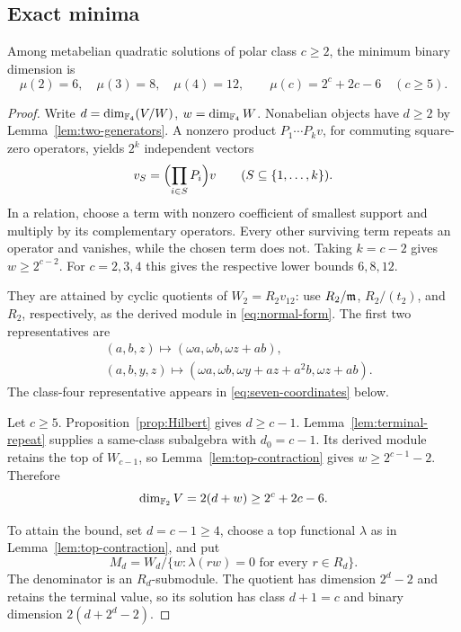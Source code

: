 \subsection{Exact minima}

\begin{theorem}\label{thm:unrestricted-minimum}
Among metabelian quadratic solutions of polar class \(c\ge2\), the
minimum binary dimension is
\[
 \mu(2)=6,\quad\mu(3)=8,\quad\mu(4)=12,\qquad
 \mu(c)=2^c+2c-6\quad(c\ge5).
\]
\end{theorem}
\begin{proof}
Write \(d=\dim_{\mathbb F_4}(V/W)\), \(w=\dim_{\mathbb F_4}W\).
Nonabelian objects have \(d\ge2\) by Lemma~\ref{lem:two-generators}.
A nonzero product \(P_1\cdots P_kv\), for commuting square-zero
operators, yields \(2^k\) independent vectors
\[
 v_S=\Bigl(\prod_{i\in S}P_i\Bigr)v\qquad(S\subseteq\{1,\ldots,k\}).
\]
In a relation, choose a term with nonzero coefficient of smallest support
and multiply by its complementary operators. Every other surviving
term repeats an operator and vanishes, while the chosen term does not.
Taking \(k=c-2\) gives \(w\ge2^{c-2}\).
For \(c=2,3,4\) this gives the respective lower bounds \(6,8,12\).

They are attained by cyclic quotients of \(W_2=R_2v_{12}\): use
\(R_2/\mathfrak m\), \(R_2/(t_2)\), and \(R_2\), respectively, as the
derived module in \eqref{eq:normal-form}.
The first two representatives are
\begin{align*}
 &(a,b,z)\longmapsto(\omega a,\omega b,\omega z+ab),\\
 &(a,b,y,z)\longmapsto
    (\omega a,\omega b,\omega y+az+a^2b,\omega z+ab).
\end{align*}
The class-four representative appears in
\eqref{eq:seven-coordinates} below.

Let \(c\ge5\). Proposition~\ref{prop:Hilbert} gives \(d\ge c-1\).
Lemma~\ref{lem:terminal-repeat} supplies a same-class subalgebra with
\(d_0=c-1\). Its derived module retains the top of \(W_{c-1}\), so
Lemma~\ref{lem:top-contraction} gives
\(w\ge2^{c-1}-2\). Therefore
\[
 \dim_{\mathbb F_2}V=2(d+w)\ge2^c+2c-6.
\]

To attain the bound, set \(d=c-1\ge4\), choose a top functional
\(\lambda\) as in Lemma~\ref{lem:top-contraction}, and put
\begin{equation}\label{eq:terminal-quotient}
 M_d=W_d/\{w:\lambda(rw)=0\text{ for every }r\in R_d\}.
\end{equation}
The denominator is an \(R_d\)-submodule. The quotient has dimension
\(2^d-2\) and retains the terminal value, so its solution has class
\(d+1=c\) and binary dimension \(2(d+2^d-2)\).
\end{proof}

